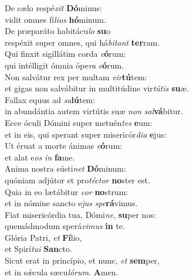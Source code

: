 \oddverse De cælo respé\textit{xit} \textbf{Dó}minus:~\*\\
\oddverse vidit omnes fí\textit{li}\textit{os} \textbf{hó}minum.\\
\evenverse De præparáto habitácu\textit{lo} \textbf{su}o~\*\\
\evenverse respéxit super omnes, qui há\textit{bi}\textit{tant} \textbf{ter}ram.\\
\oddverse Qui finxit sigillátim corda \textit{e}\textbf{ó}rum:~\*\\
\oddverse qui intélligit ómnia ópe\textit{ra} \textit{e}\textbf{ó}rum.\\
\evenverse Non salvátur rex per multam \textit{vir}\textbf{tú}tem:~\*\\
\evenverse et gigas non salvábitur in multitúdine vir\textit{tú}\textit{tis} \textbf{su}æ.\\
\oddverse Fallax equus ad \textit{sa}\textbf{lú}tem:~\*\\
\oddverse in abundántia autem virtútis suæ \textit{non} \textit{sal}\textbf{vá}bitur.\\
\evenverse Ecce óculi Dómini super metuén\textit{tes} \textbf{e}um:~\*\\
\evenverse et in eis, qui sperant super misericór\textit{di}\textit{a} \textbf{e}jus:\\
\oddverse Ut éruat a morte ánimas \textit{e}\textbf{ó}rum:~\*\\
\oddverse et alat e\textit{os} \textit{in} \textbf{fa}me.\\
\evenverse Anima nostra sústi\textit{net} \textbf{Dó}minum:~\*\\
\evenverse quóniam adjútor et pro\textit{té}\textit{ctor} \textbf{no}ster est.\\
\oddverse Quia in eo lætábitur \textit{cor} \textbf{no}strum:~\*\\
\oddverse et in nómine sancto e\textit{jus} \textit{spe}\textbf{rá}vimus.\\
\evenverse Fiat misericórdia tua, Dómi\textit{ne}, \textbf{su}per nos:~\*\\
\evenverse quemádmodum sperá\textit{vi}\textit{mus} \textbf{in} te.\\
\oddverse Glória Patri, \textit{et} \textbf{Fí}lio,~\*\\
\oddverse et Spirí\textit{tu}\textit{i} \textbf{San}cto.\\
\evenverse Sicut erat in princípio, et nunc, \textit{et} \textbf{sem}per,~\*\\
\evenverse et in sǽcula sæcu\textit{ló}\textit{rum}. \textbf{A}men.\\
